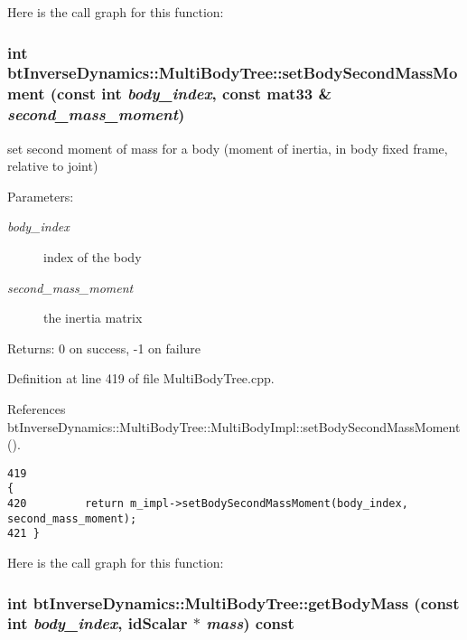 Here is the call graph for this function:\hypertarget{classbt_inverse_dynamics_1_1_multi_body_tree_f3c9c78481d8ee170e00946c8499c433}{
\subsubsection[setBodySecondMassMoment]{\setlength{\rightskip}{0pt plus 5cm}int btInverseDynamics::MultiBodyTree::setBodySecondMassMoment (const int {\em body\_\-index}, \/  const mat33 \& {\em second\_\-mass\_\-moment})}}
\label{classbt_inverse_dynamics_1_1_multi_body_tree_f3c9c78481d8ee170e00946c8499c433}


set second moment of mass for a body (moment of inertia, in body fixed frame, relative to joint) \begin{Desc}
\item[Parameters:]
\begin{description}
\item[{\em body\_\-index}]index of the body \item[{\em second\_\-mass\_\-moment}]the inertia matrix \end{description}
\end{Desc}
\begin{Desc}
\item[Returns:]0 on success, -1 on failure \end{Desc}


Definition at line 419 of file MultiBodyTree.cpp.

References btInverseDynamics::MultiBodyTree::MultiBodyImpl::setBodySecondMassMoment().

\begin{Code}\begin{verbatim}419                                                                                                 {
420         return m_impl->setBodySecondMassMoment(body_index, second_mass_moment);
421 }
\end{verbatim}
\end{Code}




Here is the call graph for this function:\hypertarget{classbt_inverse_dynamics_1_1_multi_body_tree_ca41d87e7d3717d7d621eb20ce968b23}{
\subsubsection[getBodyMass]{\setlength{\rightskip}{0pt plus 5cm}int btInverseDynamics::MultiBodyTree::getBodyMass (const int {\em body\_\-index}, \/  idScalar $\ast$ {\em mass}) const}}
\label{classbt_inverse_dynamics_1_1_multi_body_tree_ca41d87e7d3717d7d621eb20ce968b23}


